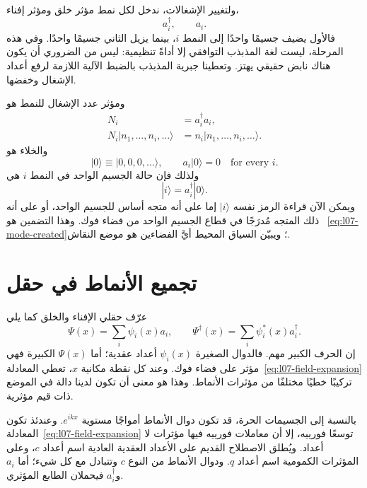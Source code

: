 ولتغيير الإشغالات، ندخل لكل نمط مؤثر خلق ومؤثر إفناء،
\begin{equation}
a_i^\dagger,\qquad a_i.
\end{equation}
فالأول يضيف جسيمًا واحدًا إلى النمط \(i\)، بينما يزيل الثاني جسيمًا واحدًا. وفي هذه المرحلة، ليست لغة المذبذب التوافقي إلا أداةً تنظيمية: ليس من الضروري أن يكون هناك نابض حقيقي يهتز. وتعطينا جبرية المذبذب بالضبط الآلية اللازمة لرفع أعداد الإشغال وخفضها.

ومؤثر عدد الإشغال للنمط هو
\begin{equation}
\begin{aligned}
N_i&=a_i^\dagger a_i,\\
N_i|n_1,\ldots,n_i,\ldots\rangle
&=n_i|n_1,\ldots,n_i,\ldots\rangle.
\end{aligned}
\end{equation}
والخلاء هو
\begin{equation}
|0\rangle\equiv|0,0,0,\ldots\rangle,
\qquad
a_i|0\rangle=0
\quad\text{for every }i.
\label{eq:l07-vacuum}
\end{equation}
ولذلك فإن حالة الجسيم الواحد في النمط \(i\) هي
\begin{equation}
|i\rangle=a_i^\dagger|0\rangle.
\label{eq:l07-mode-created}
\end{equation}
ويمكن الآن قراءة الرمز نفسه \(|i\rangle\) إما على أنه متجه أساس للجسيم الواحد، أو على أنه ذلك المتجه مُدرَجًا في قطاع الجسيم الواحد من فضاء فوك. وهذا التضمين هو ~\eqref{eq:l07-mode-created}؛ ويبيّن السياق المحيط أيَّ الفضاءين هو موضع النقاش.

\section{تجميع الأنماط في حقل}

عرّف حقلي الإفناء والخلق كما يلي
\begin{equation}
\Psi(x)=\sum_i \psi_i(x)a_i,
\qquad
\Psi^\dagger(x)=\sum_i \psi_i^*(x)a_i^\dagger.
\label{eq:l07-field-expansion}
\end{equation}
إن الحرف الكبير مهم. فالدوال الصغيرة \(\psi_i(x)\) أعداد عقدية؛ أما \(\Psi(x)\) الكبيرة فهي مؤثر على فضاء فوك. وعند كل نقطة مكانية \(x\)، تعطي المعادلة~\eqref{eq:l07-field-expansion} تركيبًا خطيًا مختلفًا من مؤثرات الأنماط. وهذا هو معنى أن تكون لدينا دالة في الموضع ذات قيم مؤثرية.

بالنسبة إلى الجسيمات الحرة، قد تكون دوال الأنماط أمواجًا مستوية \(e^{ikx}\). وعندئذ تكون المعادلة~\eqref{eq:l07-field-expansion} توسعًا فورييه، إلا أن معاملات فورييه فيها مؤثرات لا أعداد. ويُطلق الاصطلاح القديم على الأعداد العقدية العادية اسم أعداد \(c\)، وعلى المؤثرات الكمومية اسم أعداد \(q\). ودوال الأنماط من النوع \(c\) وتتبادل مع كل شيء؛ أما \(a_i\) و\(a_i^\dagger\) فيحملان الطابع المؤثري.

